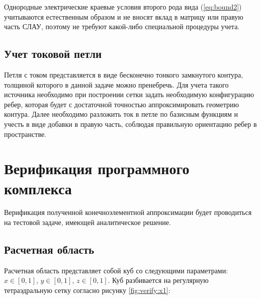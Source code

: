 \documentclass[a4paper,14pt]{article}
\begin{document}
Однородные электрические краевые условия второго рода вида (\ref{eq:bound2}) учитываются естественным образом и не вносят вклад в матрицу или правую часть СЛАУ, поэтому не требуют какой-либо специальной процедуры учета.


\subsection{Учет токовой петли}
Петля с током представляется в виде бесконечно тонкого замкнутого контура, толщиной которого в данной задаче можно пренебречь. Для учета такого источника необходимо при построении сетки задать необходимую конфигурацию ребер, которая будет с достаточной точностью аппроксимировать геометрию контура. Далее необходимо разложить ток в петле по базисным функциям и учесть в виде добавки в правую часть, соблюдая правильную ориентацию ребер в пространстве.


\clearpage
\section{Верификация программного комплекса}
Верификация полученной конечноэлементной аппроксимации будет проводиться на тестовой задаче, имеющей аналитическое решение.
\subsection{Расчетная область}
Расчетная область представляет собой куб со следующими параметрами: $x \in [0,1]$, $y \in [0,1]$, $z \in [0,1]$. Куб разбивается на регулярную тетраэдральную сетку согласно рисунку \ref{fig:verify:x1}:
\end{document}
